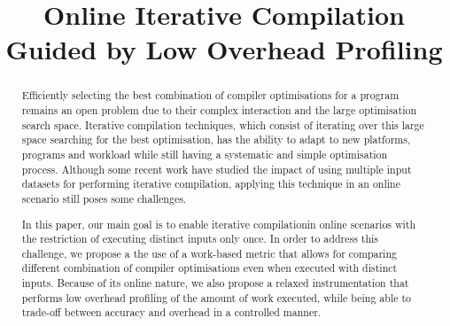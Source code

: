 \documentclass[sigplan,10pt]{acmart}
\theoremstyle{definition}
\newcommand{\itercomp}{{iterative compilation}}
\newcommand{\Itercomp}{{Iterative compilation}}
\newcommand{\IterComp}{{Iterative Compilation}}
\begin{document}
\title{Online {\IterComp}\\Guided by Low Overhead Profiling}

\author{ \vspace{10em} }
\affiliation{%
  \institution{ }
}
\email{ }







\renewcommand{\shortauthors}{R. Rocha et al.}

\begin{abstract}
Efficiently selecting the best combination of compiler optimisations for a program
remains an open problem due to their complex interaction and the large optimisation search space.
{\Itercomp} techniques, which consist of iterating
over this large space searching for the best optimisation,
has the ability to adapt to new platforms, programs and workload while still
having a systematic and simple optimisation process.
Although some recent work have studied the impact of using multiple
input datasets for performing \itercomp, applying this
technique in an online scenario still poses some challenges.

In this paper, our main goal is to enable \itercomp in
online scenarios with the restriction of executing distinct inputs
only once.
In order to address this challenge,
we propose a the use of a work-based metric that allows for comparing different
combination of compiler optimisations even when executed with distinct inputs.
Because of its online nature, we also propose a relaxed instrumentation
that performs low overhead profiling of the amount of work executed, while
being able to trade-off between accuracy and overhead in a controlled manner.
\end{abstract}
\end{document}
